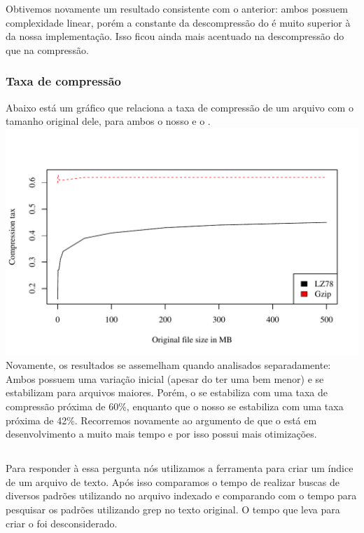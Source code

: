 Obtivemos novamente um resultado consistente com o anterior: ambos possuem
complexidade linear, porém a constante da descompressão do \gzip é muito
superior à da nossa implementação. Isso ficou ainda mais acentuado na
descompressão do que na compressão.

\subsubsection{Taxa de compressão}

Abaixo está um gráfico que relaciona a taxa de compressão de um arquivo com o
tamanho original dele, para ambos o nosso \lz e o \gzip.
\\
\includegraphics[scale=0.74]{../experiments/R/pdf/comp_tax}
\\

Novamente, os resultados se assemelham quando analisados separadamente:
Ambos possuem uma variação inicial (apesar do \gzip ter uma bem menor) e se
estabilizam para arquivos maiores. Porém, o \gzip se estabiliza com uma taxa de
compressão próxima de 60\%, enquanto que o nosso \lz se estabiliza com uma taxa
próxima de 42\%. Recorremos novamente ao argumento de que o \gzip está em
desenvolvimento a muito mais tempo e por isso possui mais otimizações.

\subsection{\rqtwo}
Para responder à essa pergunta nós utilizamos a ferramenta \ipmt para criar um
índice de um arquivo de texto. Após isso comparamos o tempo de realizar buscas
de diversos padrões utilizando \ipmt no arquivo indexado e comparando com o
tempo para pesquisar os padrões utilizando grep no texto original. O tempo
que leva para criar o \lsa foi desconsiderado.

